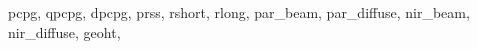                                                                                                                                                                                                                                                                        pcpg,                                                                                                                                                                                                                                                                                           qpcpg,                                                                                                                                                                                                                                                                                       dpcpg,                                                                                                                                                                                                                                                                                       prss,                                                                                                                                                                                                                                                                                           rshort,                                                                                                                                                                                                                                                                               rlong,                                                                                                                                                                                                                                                                                       par\+\_\+beam,                                                                                                                                                                                                                                                                           par\+\_\+diffuse,                                                                                                                                                                                                                                                               nir\+\_\+beam,                                                                                                                                                                                                                                                                           nir\+\_\+diffuse,                                                                                                                                                                                                                                                               geoht,                                                                                                                                                                                                                                                            